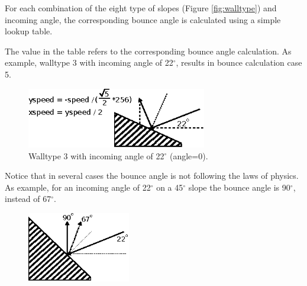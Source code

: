 \documentclass[book.tex]{subfiles}
\begin{document}
For each combination of the eight type of slopes (Figure \ref{fig:walltype}) and incoming angle, the corresponding bounce angle is calculated using a simple lookup table.\\

\par
\begin{minipage}{\textwidth}
  
\end{minipage}
\label{wallclip_array}
\par

The value in the table refers to the corresponding bounce angle calculation. As example, walltype 3 with incoming angle of 22$^{\circ}$, results in bounce calculation case 5.

\par
\begin{figure}[H]
\centering
\includegraphics[width=0.7\textwidth]{imgs/drawings/bounce_angle.eps}
\caption{Walltype 3 with incoming angle of 22$^{\circ}$ (angle=0).}
\label{fig:bounce_angles}
\end{figure}
\par

\par
\begin{minipage}{\textwidth}
  
\end{minipage}
\label{wallclip_array}
\par

Notice that in several cases the bounce angle is not following the laws of physics. As example, for an incoming angle of 22$^{\circ}$ on a 45$^{\circ}$ slope the bounce angle is 90$^{\circ}$, instead of 67$^{\circ}$.
\par
\begin{figure}[H]
\centering
\includegraphics[width=0.4\textwidth]{imgs/drawings/bounce_physics.eps}
\label{fig:bounce_angles}
\end{figure}
\par
\end{document}
